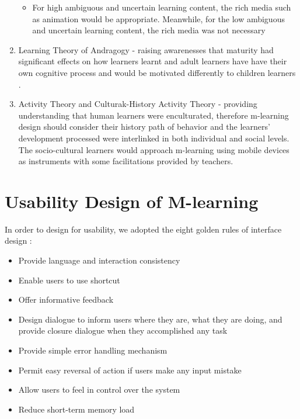 \begin{enumerate}
\begin{itemize} 
\item For high ambiguous and uncertain learning content, the rich media such as animation would be appropriate. Meanwhile, for the low ambiguous and uncertain learning content, the rich media was not necessary \cite{sun2007design}
\end{itemize}
\item Learning Theory of Andragogy - raising awarenesses that maturity had significant effects on how learners learnt \cite{knowles1970modern} and adult learners have have their own cognitive process and would be motivated differently to children learners \cite{cercone2008characteristics}. 
\item Activity Theory and Culturak-History Activity Theory - providing understanding that human learners were enculturated, therefore m-learning design should consider their history path of behavior and the learners' development processed were interlinked in both individual and social levels. The socio-cultural learners would approach m-learning using mobile devices as instruments with some facilitations provided by teachers. 

\end{enumerate} 

\section{Usability Design of M-learning} 

In order to design for usability, we adopted the eight golden rules of interface design \cite{shneiderman2010designing}: 
\begin{itemize} 
\item Provide language and interaction consistency 
\item Enable users to use shortcut 
\item Offer informative feedback
\item Design dialogue to inform users where they are, what they are doing, and provide closure dialogue when they accomplished any task 
\item Provide simple error handling mechanism 
\item Permit easy reversal of action if users make any input mistake 
\item Allow users to feel in control over the system
\item Reduce short-term memory load 
\end{itemize} 

